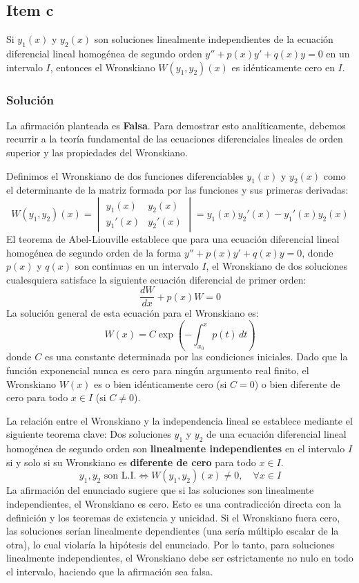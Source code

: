 \documentclass[a4paper]{article}
\begin{document}
\subsection{Item c}
Si $y_1(x)$ y $y_2(x)$ son soluciones linealmente independientes de la ecuación diferencial lineal homogénea de segundo orden $y'' + p(x)y' + q(x)y = 0$ en un intervalo $I$, entonces el Wronskiano $W(y_1, y_2)(x)$ es idénticamente cero en $I$.

\subsubsection{Solución}
La afirmación planteada es \textbf{Falsa}. Para demostrar esto analíticamente, debemos recurrir a la teoría fundamental de las ecuaciones diferenciales lineales de orden superior y las propiedades del Wronskiano.

Definimos el Wronskiano de dos funciones diferenciables $y_1(x)$ y $y_2(x)$ como el determinante de la matriz formada por las funciones y sus primeras derivadas:
$$
W(y_1, y_2)(x) = \begin{vmatrix} y_1(x) & y_2(x) \\ y_1'(x) & y_2'(x) \end{vmatrix} = y_1(x)y_2'(x) - y_1'(x)y_2(x)
$$
El teorema de Abel-Liouville establece que para una ecuación diferencial lineal homogénea de segundo orden de la forma $y'' + p(x)y' + q(x)y = 0$, donde $p(x)$ y $q(x)$ son continuas en un intervalo $I$, el Wronskiano de dos soluciones cualesquiera satisface la siguiente ecuación diferencial de primer orden:
$$
\frac{dW}{dx} + p(x)W = 0
$$
La solución general de esta ecuación para el Wronskiano es:
$$
W(x) = C \exp\left( -\int_{x_0}^x p(t) \, dt \right)
$$
donde $C$ es una constante determinada por las condiciones iniciales. Dado que la función exponencial nunca es cero para ningún argumento real finito, el Wronskiano $W(x)$ es o bien idénticamente cero (si $C=0$) o bien diferente de cero para todo $x \in I$ (si $C \neq 0$).

La relación entre el Wronskiano y la independencia lineal se establece mediante el siguiente teorema clave: Dos soluciones $y_1$ y $y_2$ de una ecuación diferencial lineal homogénea de segundo orden son \textbf{linealmente independientes} en el intervalo $I$ si y solo si su Wronskiano es \textbf{diferente de cero} para todo $x \in I$.
$$
y_1, y_2 \text{ son L.I.} \iff W(y_1, y_2)(x) \neq 0, \quad \forall x \in I
$$
La afirmación del enunciado sugiere que si las soluciones son linealmente independientes, el Wronskiano es cero. Esto es una contradicción directa con la definición y los teoremas de existencia y unicidad. Si el Wronskiano fuera cero, las soluciones serían linealmente dependientes (una sería múltiplo escalar de la otra), lo cual violaría la hipótesis del enunciado. Por lo tanto, para soluciones linealmente independientes, el Wronskiano debe ser estrictamente no nulo en todo el intervalo, haciendo que la afirmación sea falsa.
\end{document}
